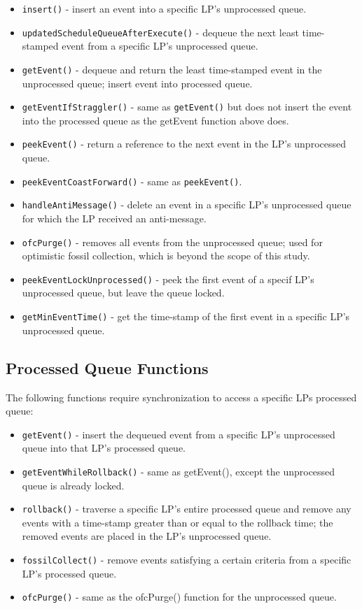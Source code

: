 \documentclass[11pt]{book}
\begin{document}
\begin{itemize}
  \item\texttt{insert()} - insert an event into a specific LP's unprocessed queue.
  \item\texttt{updatedScheduleQueueAfterExecute()} - dequeue the next least time-stamped
    event from a specific LP's unprocessed queue.
  \item\texttt{getEvent()} - dequeue and return the least time-stamped event in the
    unprocessed queue; insert event into processed queue.
  \item\texttt{getEventIfStraggler()} - same as \texttt{getEvent()} but does not insert
    the event into the processed queue as the getEvent function above does.
  \item\texttt{peekEvent()} - return a reference to the next event in the LP's unprocessed
    queue.
  \item\texttt{peekEventCoastForward()} - same as \texttt{peekEvent()}.
  \item\texttt{handleAntiMessage()} - delete an event in a specific LP's unprocessed queue
    for which the LP received an anti-message.
  \item\texttt{ofcPurge()} - removes all events from the unprocessed queue; used for
    optimistic fossil collection, which is beyond the scope of this study.
  \item\texttt{peekEventLockUnprocessed()} - peek the first event of a specif LP's
    unprocessed queue, but leave the queue locked.
  \item\texttt{getMinEventTime()} - get the time-stamp of the first event in a specific
    LP's unprocessed queue.
\end{itemize}

\subsection{Processed Queue Functions}

The following functions require synchronization to access a specific LPs
processed queue:

\begin{itemize}
  \item\texttt{getEvent()} - insert the dequeued event from a specific LP's unprocessed
    queue into that LP's processed queue.
  \item\texttt{getEventWhileRollback()} - same as getEvent(), except the unprocessed queue
    is already locked.%
  \item\texttt{rollback()} - traverse a specific LP's entire processed queue and remove
    any events with a time-stamp greater than or equal to the rollback time; the removed
    events are placed in the LP's unprocessed queue.
  \item\texttt{fossilCollect()} - remove events satisfying a certain criteria from a
    specific LP's processed queue.
  \item\texttt{ofcPurge()} - same as the ofcPurge() function for the unprocessed queue.
\end{itemize}
\end{document}
